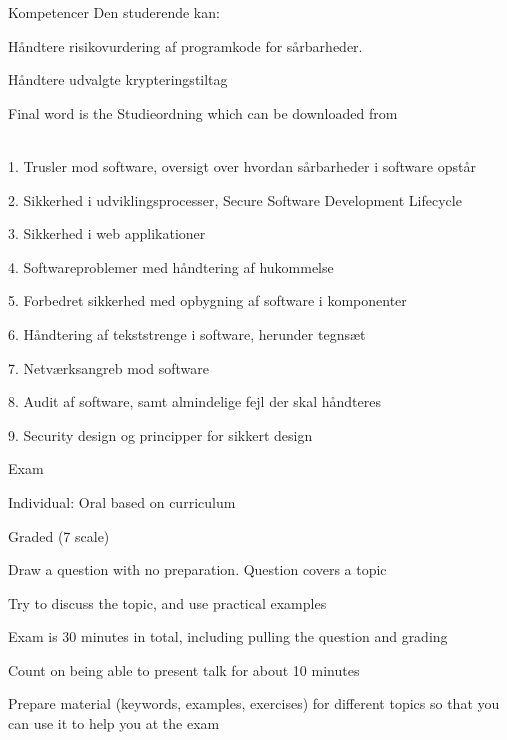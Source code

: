 \documentclass[Screen16to9,17pt]{foils}
\begin{document}
Kompetencer Den studerende kan:
\begin{list2}
\item Håndtere risikovurdering af programkode for sårbarheder.
\item Håndtere udvalgte krypteringstiltag
\end{list2}

Final word is the Studieordning which can be downloaded from\\
{\footnotesize {}\\
}



\begin{list2}
\item 1. Trusler mod software, oversigt over hvordan sårbarheder i software opstår
\item 2. Sikkerhed i udviklingsprocesser, Secure Software Development Lifecycle
\item 3. Sikkerhed i web applikationer
\item 4. Softwareproblemer med håndtering af hukommelse
\item 5. Forbedret sikkerhed med opbygning af software i komponenter
\item 6. Håndtering af tekststrenge i software, herunder tegnsæt
\item 7. Netværksangreb mod software
\item 8. Audit af software, samt almindelige fejl der skal håndteres
\item 9. Security design og principper for sikkert design
\end{list2}


\begin{list2}
\item Exam
\item Individual: Oral based on curriculum
\item Graded (7 scale)
\item Draw a question with no preparation. Question covers a topic
\item Try to discuss the topic, and use practical examples
\item Exam is 30 minutes in total, including pulling the question and grading
\item Count on being able to present talk for about 10 minutes
\item Prepare material (keywords, examples, exercises) for different topics so that you can use it to help you at the exam

\end{list2}
\end{document}
